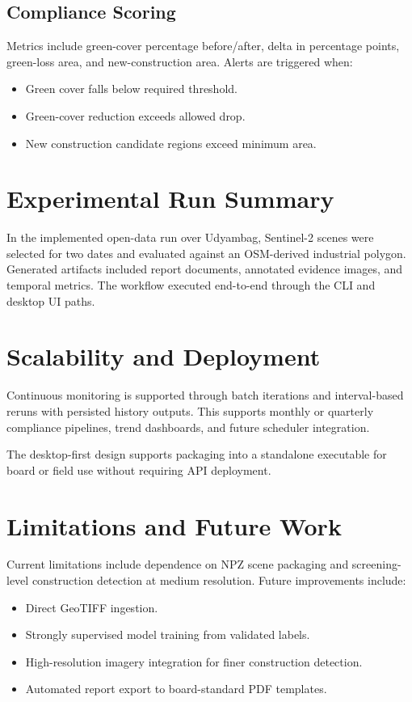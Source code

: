 \documentclass[conference]{IEEEtran}
\begin{document}
\subsection{Compliance Scoring}
Metrics include green-cover percentage before/after, delta in percentage points, green-loss area, and new-construction area. Alerts are triggered when:
\begin{itemize}
    \item Green cover falls below required threshold.
    \item Green-cover reduction exceeds allowed drop.
    \item New construction candidate regions exceed minimum area.
\end{itemize}

\section{Experimental Run Summary}
In the implemented open-data run over Udyambag, Sentinel-2 scenes were selected for two dates and evaluated against an OSM-derived industrial polygon. Generated artifacts included report documents, annotated evidence images, and temporal metrics. The workflow executed end-to-end through the CLI and desktop UI paths.

\section{Scalability and Deployment}
Continuous monitoring is supported through batch iterations and interval-based reruns with persisted history outputs. This supports monthly or quarterly compliance pipelines, trend dashboards, and future scheduler integration.

The desktop-first design supports packaging into a standalone executable for board or field use without requiring API deployment.

\section{Limitations and Future Work}
Current limitations include dependence on NPZ scene packaging and screening-level construction detection at medium resolution. Future improvements include:
\begin{itemize}
    \item Direct GeoTIFF ingestion.
    \item Strongly supervised model training from validated labels.
    \item High-resolution imagery integration for finer construction detection.
    \item Automated report export to board-standard PDF templates.
\end{itemize}
\end{document}
